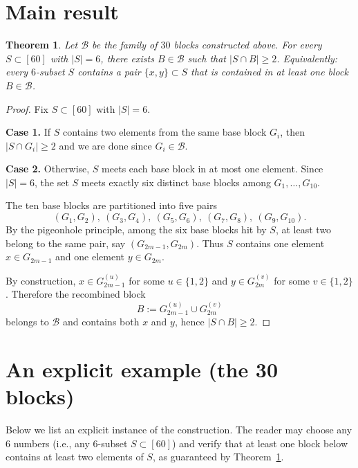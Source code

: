 \documentclass[10pt]{article}
\newtheorem{theorem}{Theorem}
\begin{document}
\section{Main result}
\begin{theorem}\label{thm:main}
Let $\mathcal{B}$ be the family of $30$ blocks constructed above. For every $S\subset[60]$ with
$|S|=6$, there exists $B\in\mathcal{B}$ such that $|S\cap B|\ge 2$.
Equivalently: every $6$-subset $S$ contains a pair $\{x,y\}\subset S$ that is contained in at least
one block $B\in\mathcal{B}$.
\end{theorem}

\begin{proof}
Fix $S\subset[60]$ with $|S|=6$.

\smallskip
\noindent\textbf{Case 1.} If $S$ contains two elements from the same base block $G_i$, then
$|S\cap G_i|\ge 2$ and we are done since $G_i\in\mathcal{B}$.

\smallskip
\noindent\textbf{Case 2.} Otherwise, $S$ meets each base block in at most one element. Since
$|S|=6$, the set $S$ meets exactly six distinct base blocks among $G_1,\dots,G_{10}$.

The ten base blocks are partitioned into five pairs
\[
(G_1,G_2),\ (G_3,G_4),\ (G_5,G_6),\ (G_7,G_8),\ (G_9,G_{10}).
\]
By the pigeonhole principle, among the six base blocks hit by $S$, at least two belong to the same
pair, say $(G_{2m-1},G_{2m})$. Thus $S$ contains one element
$x\in G_{2m-1}$ and one element $y\in G_{2m}$.

By construction, $x\in G_{2m-1}^{(u)}$ for some $u\in\{1,2\}$ and
$y\in G_{2m}^{(v)}$ for some $v\in\{1,2\}$. Therefore the recombined block
\[
B:=G_{2m-1}^{(u)}\cup G_{2m}^{(v)}
\]
belongs to $\mathcal{B}$ and contains both $x$ and $y$, hence $|S\cap B|\ge 2$.
\end{proof}

\section{An explicit example (the 30 blocks)}
Below we list an explicit instance of the construction. The reader may choose any $6$ numbers
(i.e., any $6$-subset $S\subset[60]$) and verify that at least one block below contains at least two
elements of $S$, as guaranteed by Theorem~\ref{thm:main}.
\end{document}
